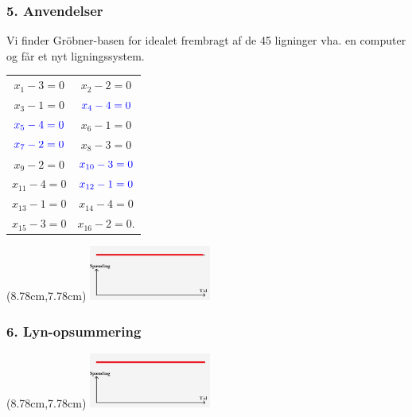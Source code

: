 \documentclass[10pt,notheorems,xcolor=pdftex,dvipsnames,table]{beamer}
\renewcommand{\{}{\left\lbrace}
\renewcommand{\}}{\right\rbrace}
\begin{document}
\begin{frame}[t]
\frametitle{
		\LARGE{5. Anvendelser}}
Vi finder Gröbner-basen for idealet frembragt af de 45 ligninger vha. en computer og får et nyt ligningssystem.
\begin{table}
\begin{tabular}{c c} 

$x_{1}-3 = 0$ & $x_{2}-2 = 0$ \\

$x_{3}-1 = 0$ & ${\color{blue}x_{4}-4 = 0}$ \\

${\color{blue}x_{5}-4 = 0}$  & $x_{6}-1 = 0$\\

${\color{blue}x_{7}-2 = 0}$ & $x_{8}-3 = 0$ \\

$x_{9}-2 = 0$ & ${\color{blue}x_{10}-3 = 0}$ \\

$x_{11}-4 = 0$ & ${\color{blue}x_{12}-1 = 0}$ \\

$x_{13}-1 = 0$ & $x_{14}-4 = 0$ \\

$x_{15}-3 = 0$ & $x_{16}-2 = 0$.

\end{tabular}
\end{table} 

				\begin{textblock*}{0.1cm}(8.78cm,7.78cm)  
					\includegraphics[width=4cm]{disposition/d21.jpg}
				\end{textblock*}	
\end{frame}









\begin{frame}[t]
\frametitle{
		\LARGE{6. Lyn-opsummering}}

				\begin{textblock*}{0.1cm}(8.78cm,7.78cm)  
					\includegraphics[width=4cm]{disposition/d22.jpg}
				\end{textblock*}	
\end{frame}
\end{document}
